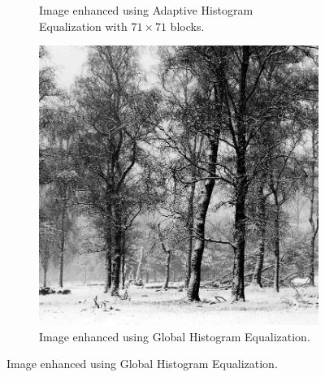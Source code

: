 \documentclass[a4paper, landscape]{article}
\begin{document}
\begin{figure}
\begin{subfigure}{0.32\linewidth}
        \caption{Image enhanced using Adaptive Histogram Equalization with $71\times 71$ blocks.}
    \end{subfigure}
    \begin{subfigure}{0.32\linewidth}
        \centering
        \includegraphics[height=0.4\textheight, keepaspectratio]{global_histogram_LC2.jpg}
		\caption{Image enhanced using Global Histogram Equalization.}
    \end{subfigure}
\end{figure}
\end{document}
